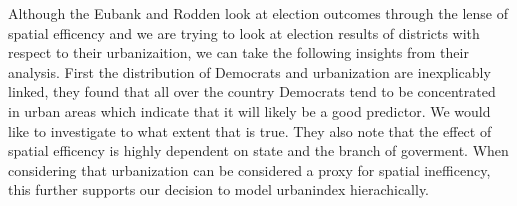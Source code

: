 \documentclass[12pt]{article}
\newcommand{\red}[1]{\textcolor{red}{#1}}
\newcommand{\blue}[1]{\textcolor{blue}{#1}}
\begin{document}
Although the Eubank and Rodden look at election outcomes through the lense of spatial efficency and we are trying to look at election results of districts with respect to their urbanizaition, we can take the following insights from their analysis. First the distribution of Democrats and urbanization are inexplicably linked, they found that all over the country Democrats tend to be concentrated in urban areas which indicate that it will likely be a good predictor. We would like to investigate to what extent that is true. They also note that the effect of spatial efficency is highly dependent on state and the branch of goverment. When considering that urbanization can be considered a proxy for spatial inefficency, this further supports our decision to model urbanindex hierachically. 










\end{document}
